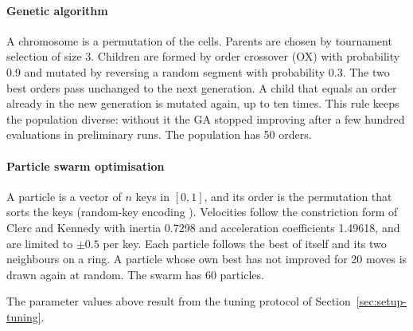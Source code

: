 \paragraph{Genetic algorithm}
A chromosome is a permutation of the cells.
Parents are chosen by tournament selection of size 3.
Children are formed by order crossover (OX) \cite{davisApplyingAdaptiveAlgorithms1985} with probability 0.9 and mutated by reversing a random segment with probability 0.3.
The two best orders pass unchanged to the next generation.
A child that equals an order already in the new generation is mutated again, up to ten times.
This rule keeps the population diverse: without it the GA stopped improving after a few hundred evaluations in preliminary runs.
The population has 50 orders.

\paragraph{Particle swarm optimisation}
A particle is a vector of $n$ keys in $[0,1]$, and its order is the permutation that sorts the keys (random-key encoding \cite{beanGeneticAlgorithmsRandom1994}).
Velocities follow the constriction form of Clerc and Kennedy \cite{clercParticleSwarmExplosion2002} with inertia 0.7298 and acceleration coefficients 1.49618, and are limited to $\pm 0.5$ per key.
Each particle follows the best of itself and its two neighbours on a ring.
A particle whose own best has not improved for 20 moves is drawn again at random.
The swarm has 60 particles.

The parameter values above result from the tuning protocol of Section~\ref{sec:setup-tuning}.
